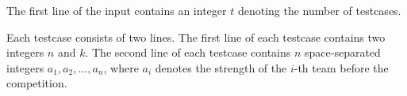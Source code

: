 The first line of the input contains an integer $t$ denoting the number of testcases.

Each testcase consists of two lines.
The first line of each testcase contains two integers $n$ and $k$.
The second line of each testcase contains $n$ space-separated integers $a_1,a_2,\ldots,a_n$, where $a_i$ denotes the strength of the $i$-th team before the competition.